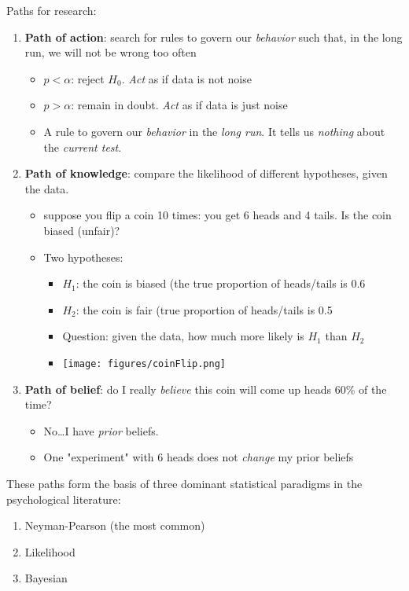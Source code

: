 \documentclass{foils}
\begin{document}
Paths for research:
\begin{enumerate}
\item \textbf{Path of action}: search for rules to govern our \emph{behavior} such that, in the long run, we will not be wrong too often
\begin{itemize}
\item $p < \alpha$: reject $H_0$.  \emph{Act} as if data is not noise
\item $p > \alpha$: remain in doubt. \emph{Act} as if data is just noise
\item A rule to govern our \emph{behavior} in the \emph{long run}.  It tells us \emph{nothing} about the \emph{current test}.
\end{itemize}

\item \textbf{Path of knowledge}:  compare the likelihood of different hypotheses, given the data.
\begin{itemize}
\item suppose you flip a coin 10 times: you get 6 heads and 4 tails.  Is the coin biased (unfair)?
\item Two hypotheses: 
\begin{itemize}
\item $H_1$: the coin is biased (the true proportion of heads/tails is 0.6
\item $H_2$: the coin is fair (true proportion of heads/tails is 0.5
\item Question: given the data, how much more likely is $H_1$ than $H_2$
\item \texttt{[image: figures/coinFlip.png]}
\end{itemize}
\end{itemize}

\item \textbf{Path of belief}: do I really \emph{believe} this coin will come up heads 60\% of the time?
\begin{itemize}
\item No\ldots{}I have \emph{prior} beliefs.
\item One "experiment" with 6 heads does not \emph{change} my prior beliefs
\end{itemize}
\end{enumerate}


These paths form the basis of three dominant statistical paradigms in the psychological literature:
\begin{enumerate}
\item Neyman-Pearson (the most common)
\item Likelihood
\item Bayesian
\end{enumerate}
\end{document}
